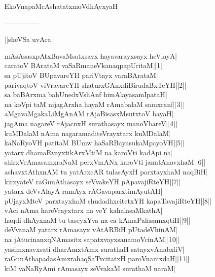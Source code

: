 \documentclass{article}
\begin{document}
\begin{center}
EkoVnapaMcAshatatxmoVdhAyxyaH
\end{center}

\begin{center}
---------------
\end{center}

\begin{center}
||sheVSa uvAca||
\end{center}

mAsAsasxpAtxBavaMsatxsayx hayavarayxsayx heVlayA|\\
caratoV BArataM vaSaRmaneVkanaqpapUritaM||1||\\
sa pUjitoV BUpavareYH pariVtayx varaBArataM|\\
parivaqtoV viVravareYH shaturxGAnxdiBirudaBxTeYH||2||\\
sa baBArxma bahUnedxVshAnf himAlayasamIpataH|\\
na koVpi taM nijagArxha hayaM rAmabalaM samxranf||3||\\
aMgavaMgakaLiMgAnAM rAjaBisasxMsutxtoV hayaH|\\
jagAma nagareV rAjacnxH surathasayx manoVhareV||4||\\
kuMDalaM nAma nagaramaditeVrayxtarx kuMDalaM|\\
kaNaRyoVH patitaM BUmw haSaRBayasukaMpayoVH||5||\\
yatarx dhamaRvayxtikArxMtiM na karoVti kadApi na|\\
shirxVrAmasamxraNaM perxVmANx karoVti janatAnavxhaM||6||\\
ashavxtAthxnAM tu yatArxcAR tulasAyxH parxtayxhaM naqBiH|\\
kirxyateV raGunAthasayx seVvakeYH pApavajiRteYH||7||\\
yatarx deVvAlayA ramAyx rAGavaparxtimAyutAH|\\
pUjayxMteV parxtayxhaM shudadhxcitetxYH kapaTavajiRteYH||8||\\
vAci nAma hareVrayxtarx na veY kahalasaMkathA|\\
haqdi dhAyxnaM tu taseyxYva na ca kAmaPalasamxqtiH||9||\\
deVvanaM yatarx rAmasayx vAtARBiH pUtadeVhinAM|\\
na jAtucinanxqNAmasitx sapatxvayxsanamoVcinAM||10||\\
yasimxnavxsati dharAmxtAmx surathaH satayxvAnabxliV|\\
raGunAthapadasAmxrahaqSaTxcitatxH paroVnamxdaH||11||\\
kiM vaNaRyAmi rAmasayx seVvakaM surathaM naraM|\\
\end{document}
